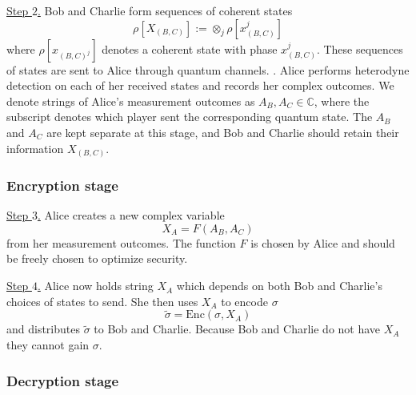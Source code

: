 \noindent \underline{Step $2$.} Bob and Charlie form sequences of coherent states
\begin{equation}
\rho\left[X_{\left(B, C\right)}\right] := \otimes_j \rho\left[x_{\left(B, C\right)}^j\right]
\end{equation}
where $\rho\left[x_{\left(B, C\right)^j}\right]$ denotes a coherent state with phase $x_{\left(B, C\right)}^j$. These sequences of states are sent to Alice through quantum channels. . Alice performs heterodyne detection on each of her received states and records her complex outcomes. We denote strings of Alice's measurement outcomes as $A_B, A_C \in \mathbb{C}$, where the subscript denotes which player sent the corresponding quantum state. The $A_B$ and $A_C$ are kept separate at this stage, and Bob and Charlie should retain their information $X_{\left(B, C\right)}$.

\subsubsection*{Encryption stage}

\noindent \underline{Step $3$.} Alice creates a new complex variable
\begin{equation}
X_A = F\left(A_B, A_C\right)
\end{equation}
from her measurement outcomes. The function $F$ is chosen by Alice and should be freely chosen to optimize security.   

\noindent \underline{Step $4$.} Alice now holds string $X_A$ which depends on both Bob and Charlie's choices of states to send. She then uses $X_A$ to encode $\sigma$
\begin{equation}
\tilde{\sigma} = \text{Enc}\left(\sigma, X_A\right)
\end{equation}
and distributes $\tilde{\sigma}$ to Bob and Charlie. Because Bob and Charlie do not have $X_A$ they cannot gain $\sigma$.

\subsubsection*{Decryption stage}

